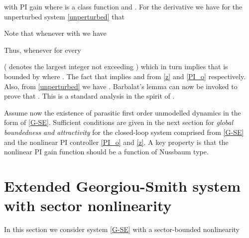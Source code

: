 \documentclass[preprint,12pt]{article}
\begin{document}
with PI gain  where  is a class  function and .
For the  derivative we have for the unperturbed system \eqref{unperturbed} that

Note that  whenever  with  we have

Thus,  whenever  for every 

( denotes the largest integer not exceeding ) which in turn implies that  is bounded by  where . The fact that  implies  and  from \eqref{z} and \eqref{PI_o} respectively. Also, from \eqref{unperturbed} we have . Barbalat's lemma can now be invoked to prove that . This is a standard analysis in the spirit of  \cite{AKO_book}.

Assume now the existence of parasitic first order unmodelled dynamics in the form of \eqref{G-SE}.  Sufficient conditions are given in the next section for \emph{global boundedness and attractivity} for the closed-loop system comprised from \eqref{G-SE} and the nonlinear PI controller  \eqref{PI_o} and \eqref{z}. A key property is that the nonlinear PI gain function  should be a function of Nussbaum type. 

\section{Extended Georgiou-Smith system with sector nonlinearity}
\label{}
In this section we consider system \eqref{G-SE} with a  sector-bounded nonlinearity
\end{document}
